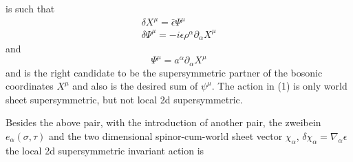 \documentclass[a4paper,showpacs,preprintnumbers,amsmath,amssymb]{revtex4}
\begin{document}
is such that
\begin{eqnarray}
\delta X^{\mu}=\bar{\epsilon}\Psi^{\mu}\nonumber\\
\delta \Psi^{\mu}=-i\epsilon\rho^{\alpha}\partial_{\alpha}X^{\mu}
\end{eqnarray}
and
\begin{equation}
[\delta_1 ,\delta_2]\Psi^{\mu } = a^{\alpha}\partial_{\alpha}X^{\mu }
\end{equation}
and is the right candidate to be the supersymmetric partner of the bosonic 
coordinates $X^{\mu}$ and also is the desired sum of $\psi^{\mu}$. The action in (1)
is only world sheet supersymmetric, but not local 2d supersymmetric.

Besides the above  pair, with the introduction of another pair, the zweibein
$e_{\alpha}(\sigma ,\tau)$ and the two dimensional spinor-cum-world sheet vector 
$\chi_{\alpha}$, $\delta\chi_{\alpha}=\nabla_{\alpha}\epsilon$ the local 2d supersymmetric 
invariant action is ~\cite{gr}
 
\end{document}
